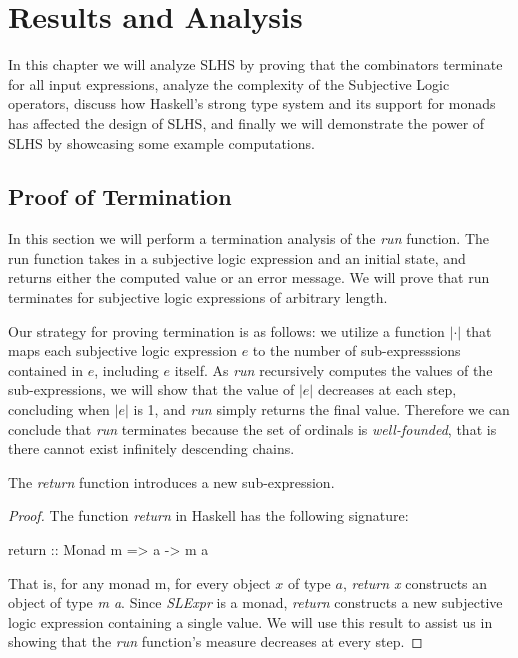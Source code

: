 \documentclass[thesis.tex]{subfiles}
\begin{document}
\chapter{Results and Analysis}
\label{chap:results-and-analysis}

In this chapter we will analyze SLHS by proving that the combinators terminate for
all input expressions, analyze the complexity of the Subjective Logic operators,
discuss how Haskell's strong type system and its support for monads has affected the
design of SLHS, and finally we will demonstrate the power of SLHS by showcasing some
example computations.


\section{Proof of Termination}

In this section we will perform a termination analysis of the \emph{run} function. The
run function takes in a subjective logic expression and an initial state, and returns
either the computed value or an error message. We will prove that run terminates for
subjective logic expressions of arbitrary length.

Our strategy for proving termination is as follows: we utilize a function $|\cdot|$ that
maps each subjective logic expression $e$ to the number of sub-expresssions contained in
$e$, including $e$ itself. As \emph{run} recursively computes the values of the
sub-expressions, we will show that the value of $|e|$ decreases at each step, concluding
when $|e|$ is 1, and \emph{run} simply returns the final value. Therefore we can conclude
that \emph{run} terminates because the set of ordinals is \emph{well-founded}, that is there
cannot exist infinitely descending chains.

\begin{lemma}
  The \emph{return} function introduces a new sub-expression.
\end{lemma}

\begin{proof}
  The function \emph{return} in Haskell has the following signature:

  \begin{spec}
    return :: Monad m => a -> m a
  \end{spec}

  That is, for any monad m, for every object $x$ of type $a$, \emph{return x} constructs
  an object of type \emph{m a}. Since \emph{SLExpr} is a monad, \emph{return} constructs
  a new subjective logic expression containing a single value. We will use this result to
  assist us in showing that the \emph{run} function's measure decreases at every step.
\end{proof}
\end{document}
